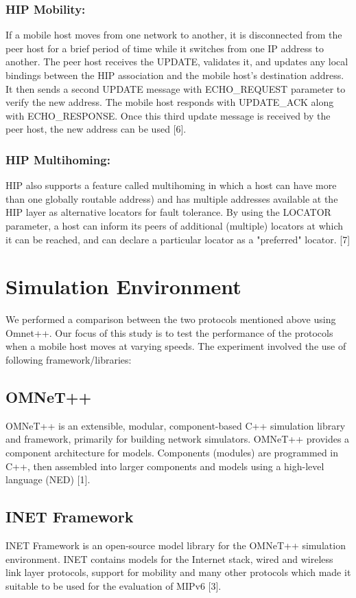 \documentclass{llncs}
\begin{document}
\subsubsection{HIP Mobility:}
If a mobile host moves from one network to another, it is disconnected from the peer host for a brief period of time while it switches from one IP address to another. The peer host receives the UPDATE, validates it, and updates any local bindings between the HIP association and the mobile host's destination address. It then sends a second UPDATE message with ECHO\_REQUEST parameter to verify the new address. The mobile host responds with UPDATE\_ACK along with ECHO\_RESPONSE. Once this third update message is received by the peer host, the new address can be used [6].

\subsubsection{HIP Multihoming:}
HIP also supports a feature called multihoming in which a host can have more than one globally routable address) and has multiple addresses available at the HIP layer as alternative locators for fault tolerance. By using the LOCATOR parameter, a host can inform its peers of additional (multiple) locators at which it can be reached, and can declare a particular locator as a "preferred" locator. [7]  

\section{Simulation Environment}
We performed a comparison between the two protocols mentioned above using Omnet++. Our focus of this study is to test the performance of the protocols when a mobile host moves at varying speeds. The experiment involved the use of following framework/libraries:

\subsection{OMNeT++}
OMNeT++ is an extensible, modular, component-based C++ simulation library and framework, primarily for building network simulators. OMNeT++ provides a component architecture for models. Components (modules) are programmed in C++, then assembled into larger components and models using a high-level language (NED) [1].

\subsection{INET Framework}
INET Framework is an open-source model library for the OMNeT++ simulation environment. INET contains models for the Internet stack, wired and wireless link layer protocols, support for mobility and many other protocols which made it suitable to be used for the evaluation of MIPv6 [3].
\end{document}

